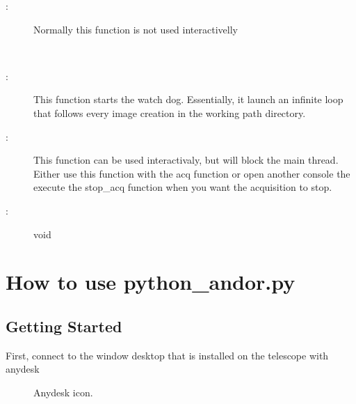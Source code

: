 \documentclass[letterpaper,10pt,english]{sphinxmanual}
\begin{document}
\begin{fulllineitems}
\begin{fulllineitems}
\begin{description}
\item[{:}] \leavevmode
Normally this function is not used interactivelly

\end{description}

\end{fulllineitems}


\begin{fulllineitems}
\label{\detokenize{index:python_andor.command.watch_dog}}~\begin{description}
\item[{:}] \leavevmode
This function starts the watch dog. Essentially, it launch an infinite loop that follows every image creation in the working path directory.

\item[{:}] \leavevmode
This function can be used interactivaly, but will block the main thread. Either use this function with the acq function or open another console the execute the stop\_acq function when you want the acquisition to stop.

\item[{:}] \leavevmode
void

\end{description}

\end{fulllineitems}


\end{fulllineitems}



\chapter{How to use python\_andor.py}
\label{\detokenize{start:how-to-use-python-andor-py}}\label{\detokenize{start::doc}}

\section{Getting Started}
\label{\detokenize{start:getting-started}}
First, connect to the window desktop that is installed on the telescope with anydesk

\begin{figure}[htbp]
\centering
\capstart

\noindent{}
\caption{Anydesk icon.}\label{\detokenize{start:id1}}\end{figure}
\end{document}
